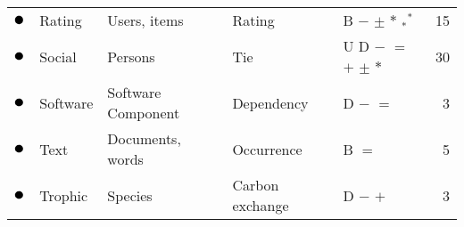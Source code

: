 \begin{tabular}{lllllr}
\textcolor{colorRating}{$\newmoon$} &Rating & Users, items & Rating & \phantom{U} \phantom{D} B $-$ \phantom{$=$} \phantom{$+$} $\pm$ \phantom{$\stackrel{+}{=}$} $*$ $_*{}^*$ \phantom{$\rightleftarrows$} \phantom{$++$}  &  15 \\
\textcolor{colorSocial}{$\newmoon$} &Social & Persons & Tie & U D \phantom{B} $-$ $=$ $+$ $\pm$ \phantom{$\stackrel{+}{=}$} $*$ \phantom{$_*{}^*$} \phantom{$\rightleftarrows$} \phantom{$++$}  &  30 \\
\textcolor{colorSoftware}{$\newmoon$} &Software & Software Component & Dependency & \phantom{U} D \phantom{B} $-$ $=$ \phantom{$+$} \phantom{$\pm$} \phantom{$\stackrel{+}{=}$} \phantom{$*$} \phantom{$_*{}^*$} \phantom{$\rightleftarrows$} \phantom{$++$}  &  3 \\
\textcolor{colorText}{$\newmoon$} &Text & Documents, words & Occurrence & \phantom{U} \phantom{D} B \phantom{$-$} $=$ \phantom{$+$} \phantom{$\pm$} \phantom{$\stackrel{+}{=}$} \phantom{$*$} \phantom{$_*{}^*$} \phantom{$\rightleftarrows$} \phantom{$++$}  &  5 \\
\textcolor{colorTrophic}{$\newmoon$} &Trophic & Species & Carbon exchange & \phantom{U} D \phantom{B} $-$ \phantom{$=$} $+$ \phantom{$\pm$} \phantom{$\stackrel{+}{=}$} \phantom{$*$} \phantom{$_*{}^*$} \phantom{$\rightleftarrows$} \phantom{$++$}  &  3 \\
\bottomrule
\end{tabular}
